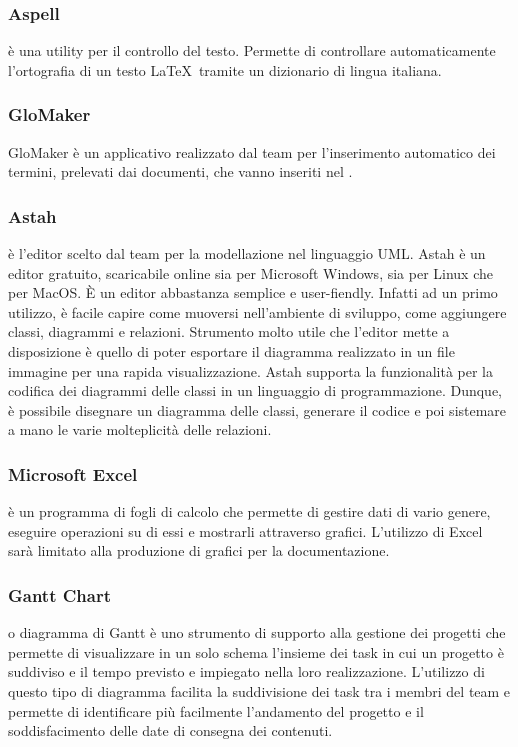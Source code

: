 \documentclass[../NormeDiProgetto.tex]{subfiles}
\begin{document}
            \subsubsection{Aspell}
             è una utility per il controllo del testo. Permette di controllare automaticamente l'ortografia di un testo \LaTeX\ tramite un dizionario di lingua italiana.
            
            \subsubsection{GloMaker}
            GloMaker è un applicativo realizzato dal team per l'inserimento automatico dei termini, prelevati dai documenti, che vanno inseriti nel \glossario.

            \subsubsection{Astah}
             è l'editor scelto dal team per la modellazione nel linguaggio UML. Astah è un editor gratuito, scaricabile online sia per Microsoft Windows, sia per Linux che per MacOS. È un editor abbastanza semplice e user-fiendly. Infatti ad un primo utilizzo, è facile capire come muoversi nell'ambiente di sviluppo, come aggiungere classi, diagrammi e relazioni. Strumento molto utile che l'editor mette a disposizione è quello di poter esportare il diagramma realizzato in un file immagine per una rapida visualizzazione. Astah supporta la funzionalità per la codifica dei diagrammi delle classi in un linguaggio di programmazione. Dunque, è possibile disegnare un diagramma delle classi, generare il codice e poi sistemare a mano le varie molteplicità delle relazioni.

            \subsubsection{Microsoft Excel}
             è un programma di fogli di calcolo che permette di gestire dati di vario genere, eseguire operazioni su di essi e mostrarli attraverso grafici. L'utilizzo di Excel sarà limitato alla produzione di grafici per la documentazione.
            
            \subsubsection{Gantt Chart}
             o diagramma di Gantt è uno strumento di supporto alla gestione dei progetti che permette di visualizzare in un solo schema l'insieme dei task in cui un progetto è suddiviso e il tempo previsto e impiegato nella loro realizzazione. L'utilizzo di questo tipo di diagramma facilita la suddivisione dei task tra i membri del team e permette di identificare più facilmente l'andamento del progetto e il soddisfacimento delle date di consegna dei contenuti.
            
\end{document}
